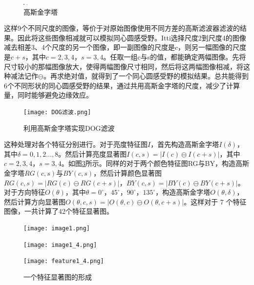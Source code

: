 \documentclass[a4paper,10pt]{article}\large
\begin{document}
\begin{figure}[!ht]
\begin{minipage}[c]{0.1\textwidth}
\centering
\includegraphics[width=0.01953125in]{figures/pyramidal_6.png}
\end{minipage}
\begin{minipage}[c]{0.1\textwidth}
\centering
\includegraphics[width=0.009765625in]{figures/pyramidal_7.png}
\end{minipage}
\caption{高斯金字塔}\label{fig:6}
\end{figure} 


这样9个不同尺度的图像，等价于对原始图像使用不同方差的高斯滤波器滤波的结果。因此将这些图像相减就可以模拟同心圆感受野。Itti选择尺度2到尺度4的图像减去相差3、4个尺度的另一个图像，即一副图像的尺度是$c$，则另一幅图像的尺度是$c+s$，其中$c=2,3,4$，$s=3,4$。任取一组c与s的值，都能确定两幅图像。先将尺寸较小的那幅图像放大，使得两幅图像尺寸相同，然后将这两幅图像相减，将这种减法记作$\ominus$。再求绝对值，就得到了一个同心圆感受野的模拟结果。总共能得到6个不同形状的同心圆感受野的结果，通过共用高斯金字塔的尺度，减少了计算量，同时能够避免边缘效应。

\begin{figure}[!htb]
\centering
\texttt{[image: DOG滤波.png]}
\caption{利用高斯金字塔实现DOG滤波}
\label{fig:7} 
\end{figure}

这种处理对各个特征分别进行。对于亮度特征图$I$，首先构造高斯金字塔$I(\delta)$，其中$\delta=0,1,2\ldots,8$。然后计算亮度显著图$I(c,s)=|I(c)\ominus I(c+s)|$，其中$c=2,3,4$，$s=3,4$。如图\ref{fig:8}所示。同样的对于两个颜色特征图RG与BY，构造高斯金字塔$RG(c,s)$与$BY(c,s)$，然后计算颜色显著图$RG(c,s)=|RG(c)\ominus RG(c+s)|$，$BY(c,s)=|BY(c)\ominus BY(c+s)|$。对于方向特征$O(\theta)$，其中$\theta=0^\circ，45^\circ，90^\circ，135^\circ$，构造高斯金字塔$O(\theta,\delta)$，然后计算方向显著图$O(\theta,c,s)=|O(\theta,c)\ominus O(\theta,c+s)|$。这样对于 7 个特征图像，一共计算了42个特征显著图。
\begin{figure}[!ht]
\begin{minipage}[c]{0.31\textwidth}
\centering
\texttt{[image: image1.png]}
\end{minipage}
\hspace{1ex}
\begin{minipage}[c]{0.31\textwidth}
\centering
\texttt{[image: image1\_4.png]}
\end{minipage}
\hspace{1ex}
\begin{minipage}[c]{0.31\textwidth}
\centering
\texttt{[image: feature1\_4.png]}
\end{minipage}
\caption{一个特征显著图的形成}\label{fig:8}
\end{figure} 
\end{document}
